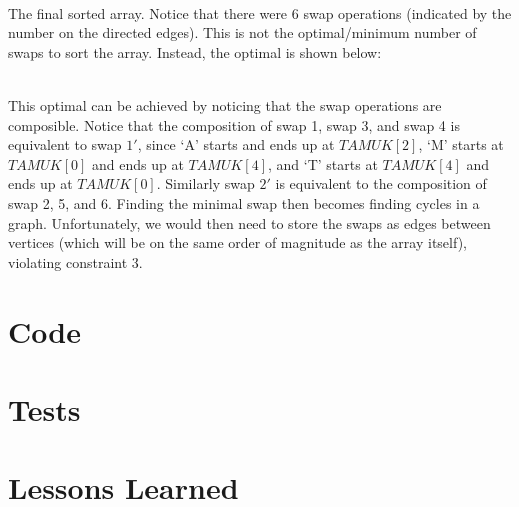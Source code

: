 \documentclass[12pt]{report}
\begin{document}
\\The final sorted array. 
Notice that there were 6 swap operations (indicated by the number on the directed edges).
This is not the optimal/minimum number of swaps to sort the array.
Instead, the optimal is shown below:\\
\pagebreak
\\This optimal can be achieved by noticing that the swap operations are composible.
Notice that the composition of swap 1, swap 3, and swap 4 is equivalent to swap $1'$, since `A' starts and ends up at $TAMUK[2]$, `M' starts at $TAMUK[0]$ and ends up at $TAMUK[4]$, and `T' starts at $TAMUK[4]$ and ends up at $TAMUK[0]$.
Similarly swap $2'$ is equivalent to the composition of swap 2, 5, and 6. Finding the minimal swap then becomes finding cycles in a graph. Unfortunately, we would then need to store the swaps as edges between vertices (which will be on the same order of magnitude as the array itself), violating constraint 3.

\chapter{Code}

\chapter{Tests}

\chapter{Lessons Learned}




 
\end{document}
